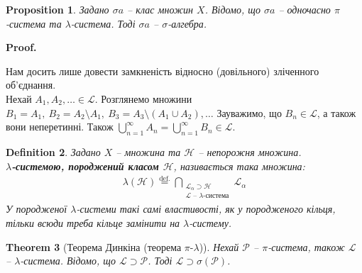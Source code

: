 \documentclass[a4paper, 10pt]{article}
\makeatletter
\theoremstyle{theoremdd}
\newtheorem{theorem}{Theorem}[subsection]
\newtheorem{definition}[theorem]{Definition}
\newtheorem{proposition}[theorem]{Proposition}
\renewenvironment{proof}[1][Proof.\\]{\par
\pushQED{\hfill \qed}%
\normalfont \topsep6\p@\@plus6\p@\relax
\trivlist
\item\relax
{\bfseries
#1\@addpunct{.}}\hspace\labelsep\ignorespaces
}{%
\popQED\endtrivlist\@endpefalse
}
\makeatother
\begin{document}
\begin{proposition}
Задано $\sigma a$ -- клас множин $X$. Відомо, що $\sigma a$ -- одночасно $\pi$-система та $\lambda$-система. Тоді $\sigma a$ -- $\sigma$-алгебра.
\end{proposition}

\begin{proof}
Нам досить лише довести замкненість відносно (довільного) зліченного об'єднання.\\
Нехай $A_1,A_2,\dots \in \mathcal{L}$. Розглянемо множини $B_1 = A_1,\ B_2 = A_2 \setminus A_1,\ B_3 = A_3 \setminus (A_1 \cup A_2), \dots$ Зауважимо, що $B_n \in \mathcal{L}$, а також вони неперетинні. Також $\displaystyle\bigcup_{n=1}^\infty A_n = \bigcup_{n=1}^\infty B_n \in \mathcal{L}$.
\end{proof}

\begin{definition}
Задано $X$ -- множина та $\mathcal{H}$ -- непорожня множина.\\
\textbf{$\lambda$-системою, породжений класом $\mathcal{H}$}, називається така множина:
\begin{align*}
\lambda(\mathcal{H}) \overset{\text{def.}}{=} \bigcap_{\substack{ \mathcal{L}_\alpha \supset \mathcal{H} \\ \mathcal{L} \text{ -- $\lambda$-система} }} \mathcal{L}_\alpha
\end{align*}
У породженої $\lambda$-системи такі самі властивості, як у породженого кільця, тільки всюди треба кільце замінити на $\lambda$-систему.
\end{definition}

\begin{theorem}[Теорема Динкіна (теорема $\pi\text{-}\lambda$)]
Нехай $\mathcal{P}$ -- $\pi$-система, також $\mathcal{L}$ -- $\lambda$-система. Відомо, що $\mathcal{L} \supset \mathcal{P}$. Тоді $\mathcal{L} \supset \sigma(\mathcal{P})$.
\end{theorem}
\end{document}
